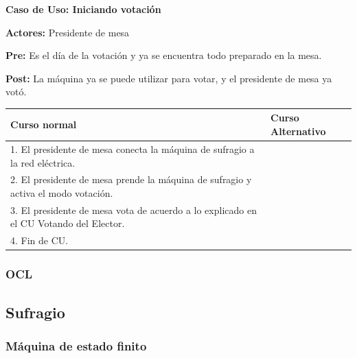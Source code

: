 \textbf{Caso de Uso: Iniciando votación}

\textbf{Actores:} Presidente de mesa

\textbf{Pre:} Es el día de la votación y ya se encuentra todo preparado en la mesa.

\textbf{Post:} La máquina ya se puede utilizar para votar, y el presidente de mesa ya votó.

\begin{table}[h!]
	
 \begin{tabular}{|p{7.5cm} | p{7.5cm}|} 
 \hline
 \textbf{Curso normal} & \textbf{Curso Alternativo} \\
 \hline

1. El presidente de mesa conecta la máquina de sufragio a la red eléctrica. & \\
\hline
2. El presidente de mesa prende la máquina de sufragio y activa el modo votación. & \\
\hline
3. El presidente de mesa vota de acuerdo a lo explicado en el CU Votando del Elector. & \\
\hline
4. Fin de CU.& \\
\hline



 \end{tabular}

\end{table}

\subsubsection{OCL}





\subsection{Sufragio}

\subsubsection{Máquina de estado finito}

